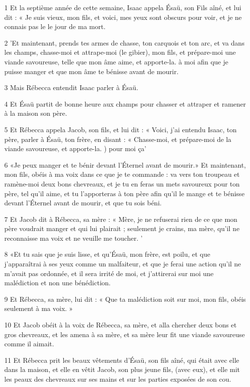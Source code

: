 \par 1 Et la septième année de cette semaine, Isaac appela Ésaü, son Fils aîné, et lui dit : « Je suis vieux, mon fils, et voici, mes yeux sont obscurs pour voir, et je ne connais pas le le jour de ma mort.
\par 2 'Et maintenant, prends tes armes de chasse, ton carquois et ton arc, et va dans les champs, chasse-moi et attrape-moi (le gibier), mon fils, et prépare-moi une viande savoureuse, telle que mon âme aime, et apporte-la. à moi afin que je puisse manger et que mon âme te bénisse avant de mourir.
\par 3 Mais Rébecca entendit Isaac parler à Ésaü.
\par 4 Et Ésaü partit de bonne heure aux champs pour chasser et attraper et ramener à la maison son père.
\par 5 Et Rébecca appela Jacob, son fils, et lui dit : « Voici, j'ai entendu Isaac, ton père, parler à Ésaü, ton frère, en disant : « Chasse-moi, et prépare-moi de la viande savoureuse, et apporte-la. ) pour moi ça'
\par 6 «Je peux manger et te bénir devant l'Éternel avant de mourir.» Et maintenant, mon fils, obéis à ma voix dans ce que je te commande : va vers ton troupeau et ramène-moi deux bons chevreaux, et je tu en feras un mets savoureux pour ton père, tel qu'il aime, et tu l'apporteras à ton père afin qu'il le mange et te bénisse devant l'Éternel avant de mourir, et que tu sois béni.
\par 7 Et Jacob dit à Rébecca, sa mère : « Mère, je ne refuserai rien de ce que mon père voudrait manger et qui lui plairait ; seulement je crains, ma mère, qu'il ne reconnaisse ma voix et ne veuille me toucher. '
\par 8 «Et tu sais que je suis lisse, et qu'Ésaü, mon frère, est poilu, et que j'apparaîtrai à ses yeux comme un malfaiteur, et que je ferai une action qu'il ne m'avait pas ordonnée, et il sera irrité de moi, et j'attirerai sur moi une malédiction et non une bénédiction.
\par 9 Et Rébecca, sa mère, lui dit : « Que ta malédiction soit sur moi, mon fils, obéis seulement à ma voix. »
\par 10 Et Jacob obéit à la voix de Rébecca, sa mère, et alla chercher deux bons et gros chevreaux, et les amena à sa mère, et sa mère leur fit une viande savoureuse comme il aimait.
\par 11 Et Rébecca prit les beaux vêtements d'Ésaü, son fils aîné, qui était avec elle dans la maison, et elle en vêtit Jacob, son plus jeune fils, (avec eux), et elle mit les peaux des chevreaux sur ses mains et sur les parties exposées de son cou.

